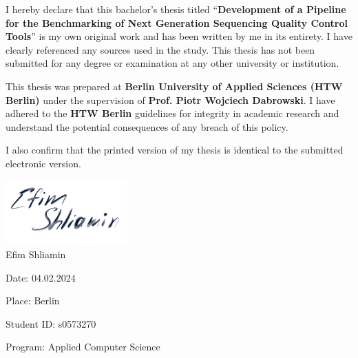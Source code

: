 
I hereby declare that this bachelor's thesis titled ``\textbf{Development of a Pipeline for the Benchmarking of Next Generation Sequencing Quality Control Tools}'' is my own original work and has been written by me in its entirety. I have clearly referenced any sources used in the study. This thesis has not been submitted for any degree or examination at any other university or institution.

This thesis was prepared at \textbf{Berlin University of Applied Sciences (HTW Berlin)} under the supervision of \textbf{Prof. Piotr Wojciech Dabrowski}. I have adhered to the \textbf{HTW Berlin} guidelines for integrity in academic research and understand the potential consequences of any breach of this policy.

I also confirm that the printed version of my thesis is identical to the submitted electronic version.



\noindent
\includegraphics[width=0.35\textwidth]{resources/images/signature.png}\\
Efim Shliamin

\vspace{1.0cm}


\noindent Date: 04.02.2024 \par
\noindent Place: Berlin \par
\noindent Student ID: s0573270 \par
\noindent Program: Applied Computer Science